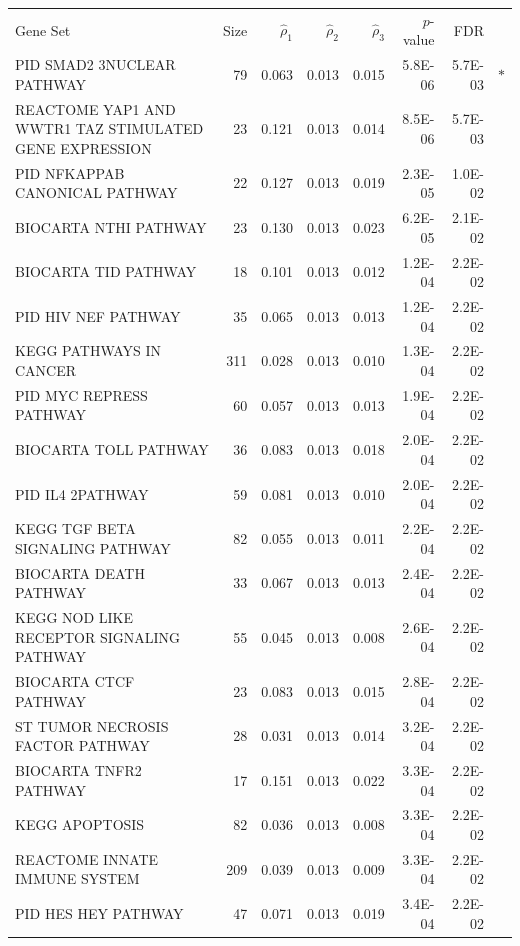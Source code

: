 \documentclass[a4,center,fleqn]{NAR}
\begin{document}
\begin{table}[!ht]
		\begin{tabular}{p{3in}rrrrrrr}
			\toprule
			Gene Set & Size & $\hat\rho_1$ & $\hat\rho_2$ & $\hat\rho_3$ & $p$-value & FDR & \\ 
			\colrule
			PID SMAD2 3NUCLEAR PATHWAY & 79 & 0.063 & 0.013 & 0.015 & 5.8E-06 & 5.7E-03 & $\ast$ \\ 
			REACTOME YAP1 AND WWTR1 TAZ STIMULATED GENE EXPRESSION & 23 & 0.121 & 0.013 & 0.014 & 
			8.5E-06 & 5.7E-03 &  \\ 
			PID NFKAPPAB CANONICAL PATHWAY & 22 & 0.127 & 0.013 & 0.019 & 2.3E-05 & 1.0E-02 &  \\ 
			BIOCARTA NTHI PATHWAY & 23 & 0.130 & 0.013 & 0.023 & 6.2E-05 & 2.1E-02 &  \\ 
			BIOCARTA TID PATHWAY & 18 & 0.101 & 0.013 & 0.012 & 1.2E-04 & 2.2E-02 &  \\ 
			PID HIV NEF PATHWAY & 35 & 0.065 & 0.013 & 0.013 & 1.2E-04 & 2.2E-02 &  \\ 
			KEGG PATHWAYS IN CANCER & 311 & 0.028 & 0.013 & 0.010 & 1.3E-04 & 2.2E-02 &  \\ 
			PID MYC REPRESS PATHWAY & 60 & 0.057 & 0.013 & 0.013 & 1.9E-04 & 2.2E-02 &  \\ 
			BIOCARTA TOLL PATHWAY & 36 & 0.083 & 0.013 & 0.018 & 2.0E-04 & 2.2E-02 &  \\ 
			PID IL4 2PATHWAY & 59 & 0.081 & 0.013 & 0.010 & 2.0E-04 & 2.2E-02 &  \\ 
			KEGG TGF BETA SIGNALING PATHWAY & 82 & 0.055 & 0.013 & 0.011 & 2.2E-04 & 2.2E-02 &  \\ 
			BIOCARTA DEATH PATHWAY & 33 & 0.067 & 0.013 & 0.013 & 2.4E-04 & 2.2E-02 &  \\ 
			KEGG NOD LIKE RECEPTOR SIGNALING PATHWAY & 55 & 0.045 & 0.013 & 0.008 & 2.6E-04 & 
			2.2E-02 &  \\ 
			BIOCARTA CTCF PATHWAY & 23 & 0.083 & 0.013 & 0.015 & 2.8E-04 & 2.2E-02 &  \\ 
			ST TUMOR NECROSIS FACTOR PATHWAY & 28 & 0.031 & 0.013 & 0.014 & 3.2E-04 & 2.2E-02 &  \\ 
			BIOCARTA TNFR2 PATHWAY & 17 & 0.151 & 0.013 & 0.022 & 3.3E-04 & 2.2E-02 &  \\ 
			KEGG APOPTOSIS & 82 & 0.036 & 0.013 & 0.008 & 3.3E-04 & 2.2E-02 &  \\ 
			REACTOME INNATE IMMUNE SYSTEM & 209 & 0.039 & 0.013 & 0.009 & 3.3E-04 & 2.2E-02 &  \\ 
			PID HES HEY PATHWAY & 47 & 0.071 & 0.013 & 0.019 & 3.4E-04 & 2.2E-02 &  \\ 

\end{tabular}
\end{table}
\end{document}

